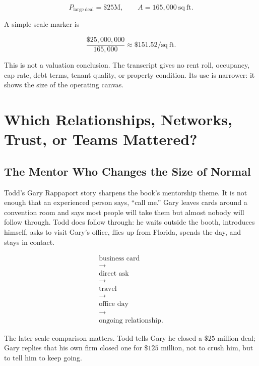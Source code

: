 \documentclass[11pt,oneside]{book}
\begin{document}
\begin{equation}
P_{\mathrm{large\ deal}}=\$25\mathrm{M},
\qquad
A=165{,}000\ \mathrm{sq\ ft}.
\end{equation}

A simple scale marker is

\begin{equation}
\frac{\$25{,}000{,}000}{165{,}000}
\approx
\$151.52/\mathrm{sq\ ft}.
\end{equation}

This is not a valuation conclusion. The transcript gives no rent roll, occupancy, cap rate, debt terms, tenant quality, or property condition. Its use is narrower: it shows the size of the operating canvas.

\chapter{Which Relationships, Networks, Trust, or Teams Mattered?}

\section{The Mentor Who Changes the Size of Normal}

Todd's Gary Rappaport story sharpens the book's mentorship theme. It is not enough that an experienced person says, ``call me.'' Gary leaves cards around a convention room and says most people will take them but almost nobody will follow through. Todd does follow through: he waits outside the booth, introduces himself, asks to visit Gary's office, flies up from Florida, spends the day, and stays in contact.

\begin{equation}
\begin{gathered}
\text{business card}\\
\rightarrow\\
\text{direct ask}\\
\rightarrow\\
\text{travel}\\
\rightarrow\\
\text{office day}\\
\rightarrow\\
\text{ongoing relationship}.
\end{gathered}
\end{equation}

The later scale comparison matters. Todd tells Gary he closed a \(\$25\) million deal; Gary replies that his own firm closed one for \(\$125\) million, not to crush him, but to tell him to keep going.
\end{document}
